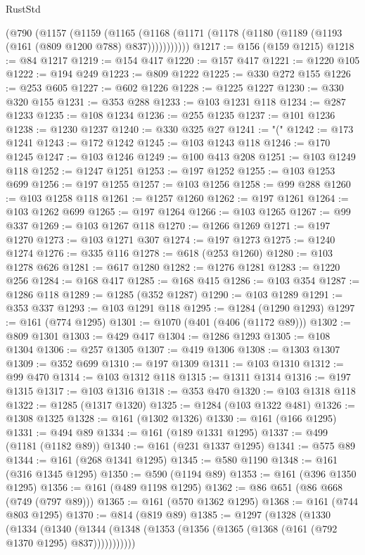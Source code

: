\begin{lexlean}{RustStd}
\begin{coremodule}
{\begin{coremodule}
{{{{{{{{{{{{{{{{{{{{{{{{{{    (@790
      (@1157
        (@1159
          (@1165 (@1168 (@1171 (@1178 (@1180 (@1189 (@1193 (@161 (@809 @1200 @788) @837)))))))))))
@1217 := @156 (@159 @1215)
@1218 := @84 @1217
@1219 := @154 @417
@1220 := @157 @417
@1221 := @1220 @105
@1222 := @194 @249
@1223 := @809 @1222
@1225 := @330 @272 @155
@1226 := @253 @605
@1227 := @602 @1226
@1228 := @1225 @1227
@1230 := @330 @320 @155
@1231 := @353 @288
@1233 := @103 @1231 @118
@1234 := @287 @1233
@1235 := @108 @1234
@1236 := @255 @1235
@1237 := @101 @1236
@1238 := @1230 @1237
@1240 := @330 @325 @27
@1241 := "("
@1242 := @173 @1241
@1243 := @172 @1242
@1245 := @103 @1243 @118
@1246 := @170 @1245
@1247 := @103 @1246
@1249 := @100 @413 @208
@1251 := @103 @1249 @118
@1252 := @1247 @1251
@1253 := @197 @1252
@1255 := @103 @1253 @699
@1256 := @197 @1255
@1257 := @103 @1256
@1258 := @99 @288
@1260 := @103 @1258 @118
@1261 := @1257 @1260
@1262 := @197 @1261
@1264 := @103 @1262 @699
@1265 := @197 @1264
@1266 := @103 @1265
@1267 := @99 @337
@1269 := @103 @1267 @118
@1270 := @1266 @1269
@1271 := @197 @1270
@1273 := @103 @1271 @307
@1274 := @197 @1273
@1275 := @1240 @1274
@1276 := @335 @116
@1278 := @618 (@253 @1260)
@1280 := @103 @1278 @626
@1281 := @617 @1280
@1282 := @1276 @1281
@1283 := @1220 @256
@1284 := @168 @417
@1285 := @168 @415
@1286 := @103 @354
@1287 := @1286 @118
@1289 := @1285 (@352 @1287)
@1290 := @103 @1289
@1291 := @353 @337
@1293 := @103 @1291 @118
@1295 := @1284 (@1290 @1293)
@1297 := @161 (@774 @1295)
@1301 := @1070 (@401 (@406 (@1172 @89)))
@1302 := @809 @1301
@1303 := @429 @417
@1304 := @1286 @1293
@1305 := @108 @1304
@1306 := @257 @1305
@1307 := @419 @1306
@1308 := @1303 @1307
@1309 := @352 @699
@1310 := @197 @1309
@1311 := @103 @1310
@1312 := @99 @470
@1314 := @103 @1312 @118
@1315 := @1311 @1314
@1316 := @197 @1315
@1317 := @103 @1316
@1318 := @353 @470
@1320 := @103 @1318 @118
@1322 := @1285 (@1317 @1320)
@1325 := @1284 (@103 @1322 @481)
@1326 := @1308 @1325
@1328 := @161 (@1302 @1326)
@1330 := @161 (@166 @1295)
@1331 := @494 @89
@1334 := @161 (@189 @1331 @1295)
@1337 := @499 (@1181 (@1182 @89))
@1340 := @161 (@231 @1337 @1295)
@1341 := @575 @89
@1344 := @161 (@268 @1341 @1295)
@1345 := @580 @1190
@1348 := @161 (@316 @1345 @1295)
@1350 := @590 (@1194 @89)
@1353 := @161 (@396 @1350 @1295)
@1356 := @161 (@489 @1198 @1295)
@1362 := @86 @651 (@86 @668 (@749 (@797 @89)))
@1365 := @161 (@570 @1362 @1295)
@1368 := @161 (@744 @803 @1295)
@1370 := @814 (@819 @89)
@1385 := @1297
    (@1328
      (@1330
        (@1334
          (@1340 (@1344 (@1348 (@1353 (@1356 (@1365 (@1368 (@161 (@792 @1370 @1295) @837)))))))))))
}}}}}}}}}}}}}}}}}}}}}}}}}}
\end{coremodule}}
\end{coremodule}
\end{lexlean}
